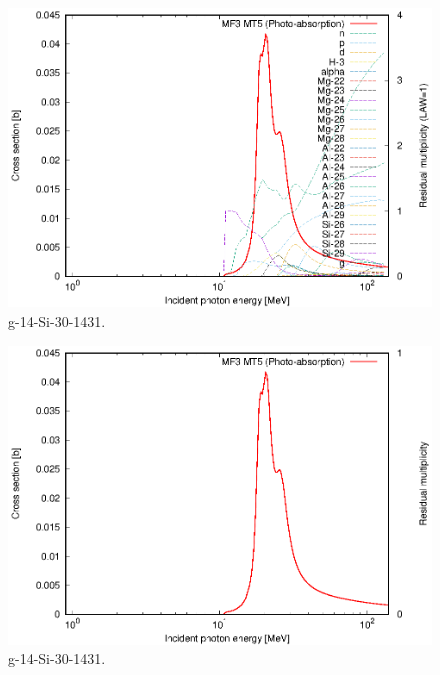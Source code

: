 \begin{figure}
 \includegraphics[width=\linewidth]{eps/g_14-Si-30_1431.eps}
  \caption{g-14-Si-30-1431.}
\end{figure}
\begin{figure}
 \includegraphics[width=\linewidth]{eps-law0/g_14-Si-30_1431.eps}
 \caption{g-14-Si-30-1431.}
\end{figure}
\newpage \clearpage

